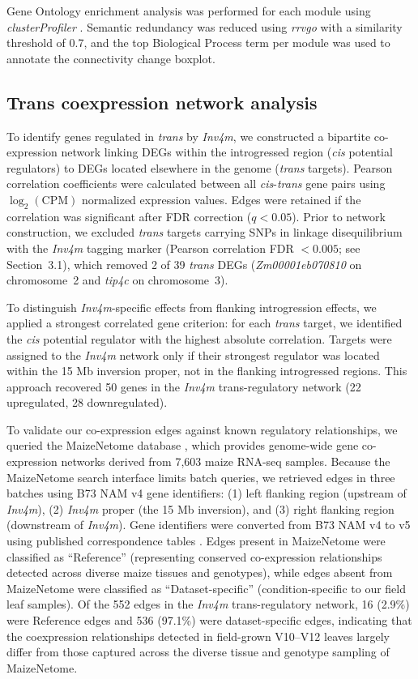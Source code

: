 \documentclass[9pt,twocolumn,twoside]{rilabRxiv}
\newcommand{\invfour}{\textit{Inv4m}\xspace}
\begin{document}
Gene Ontology enrichment analysis was performed for each module using \textit{clusterProfiler} \cite{yu2012}.
Semantic redundancy was reduced using \textit{rrvgo} \cite{sayols2023} with a similarity threshold of 0.7, and the top Biological Process term per module was used to annotate the connectivity change boxplot.

\subsection{Trans coexpression network analysis}

To identify genes regulated in \textit{trans} by \invfour, we constructed a bipartite co-expression network linking DEGs within the introgressed region (\textit{cis} potential regulators) to DEGs located elsewhere in the genome (\textit{trans} targets).
Pearson correlation coefficients were calculated between all \textit{cis}-\textit{trans} gene pairs using $\log_2(\text{CPM})$ normalized expression values.
Edges were retained if the correlation was significant after FDR correction ($q < 0.05$).
Prior to network construction, we excluded \textit{trans} targets carrying SNPs in linkage disequilibrium with the \invfour tagging marker (Pearson correlation FDR $< 0.005$; see Section~3.1), which removed 2 of 39 \textit{trans} DEGs (\textit{Zm00001eb070810} on chromosome~2 and \textit{tip4c} on chromosome~3).

To distinguish \invfour-specific effects from flanking introgression effects, we applied a strongest correlated gene criterion: for each \textit{trans} target, we identified the \textit{cis} potential regulator with the highest absolute correlation.
Targets were assigned to the \invfour network only if their strongest regulator was located within the 15 Mb inversion proper, not in the flanking introgressed regions.
This approach recovered 50 genes in the \invfour trans-regulatory network (22 upregulated, 28 downregulated).

To validate our co-expression edges against known regulatory relationships, we queried the MaizeNetome database \cite{feng2023}, which provides genome-wide gene co-expression networks derived from 7,603 maize RNA-seq samples.
Because the MaizeNetome search interface limits batch queries, we retrieved edges in three batches using B73 NAM v4 gene identifiers: (1) left flanking region (upstream of \invfour), (2) \invfour proper (the 15 Mb inversion), and (3) right flanking region (downstream of \invfour).
Gene identifiers were converted from B73 NAM v4 to v5 using published correspondence tables \cite{hufford2021}.
Edges present in MaizeNetome were classified as ``Reference'' (representing conserved co-expression relationships detected across diverse maize tissues and genotypes), while edges absent from MaizeNetome were classified as ``Dataset-specific'' (condition-specific to our field leaf samples).
Of the 552 edges in the \invfour trans-regulatory network, 16 (2.9\%) were Reference edges and 536 (97.1\%) were dataset-specific edges, indicating that the coexpression relationships detected in field-grown V10--V12 leaves largely differ from those captured across the diverse tissue and genotype sampling of MaizeNetome.
\end{document}

